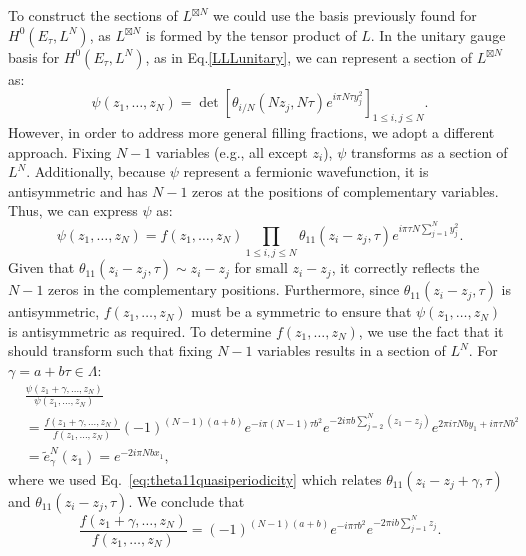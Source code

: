 \documentclass[a4paper,11pt]{article}
\begin{document}
To construct the sections of $L^{\boxtimes N}$ we could use the basis previously found for $H^{0}(E_{\tau},L^{N})$, as $L^{\boxtimes N}$ is formed by the tensor product of $L$.  
In the unitary gauge basis for $H^{0}(E_{\tau}, L^{N})$, as in Eq.\eqref{LLLunitary}, we can represent a section of $L^{\boxtimes N}$ as:
\begin{equation*}
    \psi(z_{1},\dots,z_{N}) = \det\left[\theta_{i/N}(Nz_{j},N\tau)e^{i\pi N \tau y^2_j}\right]_{1\leq i,j \leq N}.
\end{equation*}
However, in order to address more general filling fractions, we adopt a different approach. Fixing $N-1$ variables (e.g., all except $z_{i}$), $\psi$ transforms as a section of $L^{N}$. Additionally, because $\psi$  represent a fermionic wavefunction, it is antisymmetric and has $N-1$ zeros at the positions of complementary variables. Thus, we can express $\psi$ as:
\begin{equation}
    \psi(z_{1},\dots,z_{N}) = f(z_{1},\dots,z_{N})\prod_{1\leq i,j\leq N}\theta_{11}(z_{i}-z_{j},\tau)e^{i\pi \tau N \sum_{j=1}^{N}y^2_j}.
    \label{preinteger}
\end{equation}
Given that $\theta_{11}(z_{i}-z_{j},\tau)\sim z_{i}-z_{j}$ for small $z_{i}-z_{j}$, it correctly reflects the $N-1$ zeros in the complementary positions. Furthermore, since $\theta_{11}(z_{i}-z_{j},\tau)$ is antisymmetric, $f(z_{1},\dots,z_{N})$ must be a symmetric to ensure that $\psi(z_{1},\dots,z_{N})$ is antisymmetric as required. To determine $f(z_{1},\dots,z_{N})$, we use the fact that it should transform such that fixing $N-1$ variables results in a section of $L^{N}$. For $\gamma = a+b\tau\in\Lambda$:
\begin{align*}
&\frac{\psi(z_{1}+\gamma,\dots,z_{N})}{\psi(z_{1},\dots,z_{N})} \nonumber\\
&= \frac{f(z_{1}+\gamma,\dots,z_{N})}{f(z_{1},\dots,z_{N})}(-1)^{(N-1)(a+b)}e^{-i\pi(N-1)\tau b^2}e^{-2i\pi b\sum_{j=2}^{N}(z_{1}-z_{j})}e^{2\pi i\tau N b y_1+i\pi \tau N b^2} \\
&= \widetilde{e}_{\gamma}^{N}(z_{1}) = e^{-2 i\pi N b x_1},  
\end{align*}
where we used Eq.~\eqref{eq:theta11quasiperiodicity} which relates $\theta_{11}(z_{i}-z_{j}+\gamma,\tau)$ and $\theta_{11}(z_{i}-z_{j},\tau)$. We conclude that
\begin{equation}
\frac{f(z_{1}+\gamma,\dots,z_{N})}{f(z_{1},\dots,z_{N})} = (-1)^{(N-1)(a+b)}e^{-i\pi\tau b^2}e^{-2\pi ib\sum_{j=1}^{N}z_{j}}.   
\label{eq:quasiperiodicinteger}
\end{equation}
\end{document}
